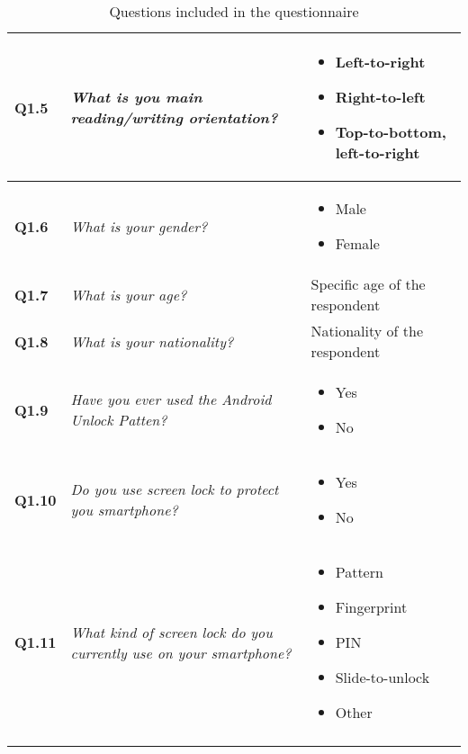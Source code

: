 \begin{longtable}{| p{1cm} | m{6.5cm} | m{3.5cm} |}
      {\bf Q1.5} & 
      {\it What is you main reading/writing orientation?} &
      \begin{itemize}
        \item Left-to-right
        \item Right-to-left
        \item Top-to-bottom, left-to-right
      \end{itemize} \\ \hline

      {\bf Q1.6} & 
      {\it What is your gender?} &
      \begin{itemize}
        \item Male
        \item Female
      \end{itemize} \\ \hline

      {\bf Q1.7} & 
      {\it What is your age?} &
      Specific age of the respondent \\ \hline

      {\bf Q1.8} & 
      {\it What is your nationality?} &
      Nationality of the respondent \\ \hline

      {\bf Q1.9} & 
      {\it Have you ever used the Android Unlock Patten?} &
      \begin{itemize}
        \item Yes
        \item No
      \end{itemize} \\ \hline

      {\bf Q1.10} & 
      {\it Do you use screen lock to protect you smartphone?} &
      \begin{itemize}
        \item Yes
        \item No
      \end{itemize} \\ \hline

      {\bf Q1.11} & 
      {\it What kind of screen lock do you currently use on your smartphone?} &
      \begin{itemize}
        \item Pattern
        \item Fingerprint
        \item PIN
        \item Slide-to-unlock
        \item Other
      \end{itemize} \\ \hline
    \caption{Questions included in the questionnaire}
    \end{longtable}

